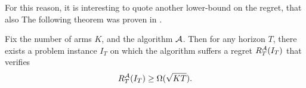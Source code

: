 For this reason, it is interesting to quote another lower-bound on the regret, that also
The following theorem was proven in \cite{Auer02NonStochastic}.


\begin{theorem}\label{thm:2:worstCaseLowerBound}
    Fix the number of arms $K$, and the algorithm $\mathcal{A}$.
    Then for any horizon $T$, there exists a problem instance $I_T$ on which the algorithm suffers a regret $R_T^{\mathcal{A}}(I_T)$ that verifies
    \begin{equation}
        R_T^{\mathcal{A}}(I_T) \geq \Omega(\sqrt{K T}).
    \end{equation}
\end{theorem}











